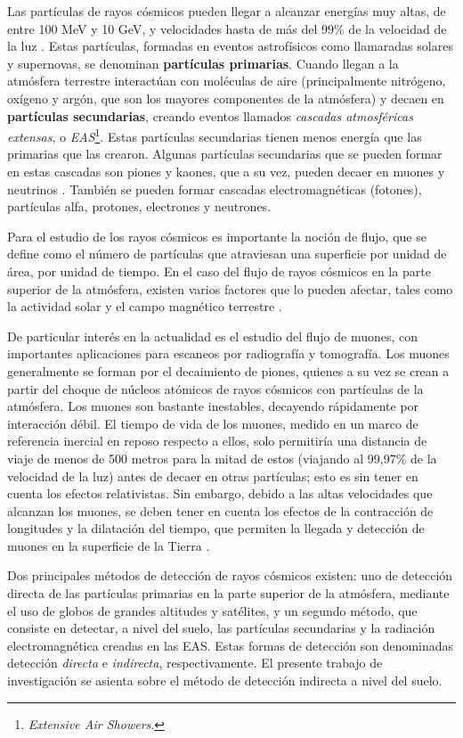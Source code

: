\documentclass[12pt]{report}
\begin{document}
Las partículas de rayos cósmicos pueden llegar a alcanzar energías muy altas, de entre 100 MeV y 10 GeV, y velocidades hasta de más del 99\% de la velocidad de la luz \cite{moldwin2008introduction}. Estas partículas, formadas en eventos astrofísicos como llamaradas solares y supernovas, se denominan \textbf{partículas primarias}. Cuando llegan a la atmósfera terrestre interactúan con moléculas de aire (principalmente nitrógeno, oxígeno y argón, que son los mayores componentes de la atmósfera) y decaen en \textbf{partículas secundarias}, creando eventos llamados \textit{cascadas atmosféricas extensas}, o \textit{EAS}\footnote{\textit{Extensive Air Showers}.}. Estas partículas secundarias tienen menos energía que las primarias que las crearon. Algunas partículas secundarias que se pueden formar en estas cascadas son piones y kaones, que a su vez, pueden decaer en muones y neutrinos \cite{grieder2010extensive}. También se pueden formar cascadas electromagnéticas (fotones), partículas alfa, protones, electrones y neutrones.

Para el estudio de los rayos cósmicos es importante la noción de flujo, que se define como el número de partículas que atraviesan una superficie por unidad de área, por unidad de tiempo. En el caso del flujo de rayos cósmicos en la parte superior de la atmósfera, existen varios factores que lo pueden afectar, tales como la actividad solar y el campo magnético terrestre \cite{PhysRevD.98.030001}.

De particular interés en la actualidad es el estudio del flujo de muones, con importantes aplicaciones para escaneos por radiografía y tomografía. Los muones generalmente se forman por el decaimiento de piones, quienes a su vez se crean a partir del choque de núcleos atómicos de rayos cósmicos con partículas de la atmósfera. Los muones son bastante inestables, decayendo rápidamente por interacción débil. El tiempo de vida de los muones, medido en un marco de referencia inercial en reposo respecto a ellos, solo permitiría una distancia de viaje de menos de 500 metros para la mitad de estos (viajando al 99,97\% de la velocidad de la luz) antes de decaer en otras partículas; esto es sin tener en cuenta los efectos relativistas. Sin embargo, debido a las altas velocidades que alcanzan los muones, se deben tener en cuenta los efectos de la contracción de longitudes y la dilatación del tiempo, que permiten la llegada y detección de muones en la superficie de la Tierra \cite{cunningham2019high}.

Dos principales métodos de detección de rayos cósmicos existen: uno de detección directa de las partículas primarias en la parte superior de la atmósfera, mediante el uso de globos de grandes altitudes y satélites, y un segundo método, que consiste en detectar, a nivel del suelo, las partículas secundarias y la radiación electromagnética creadas en las EAS. Estas formas de detección son denominadas detección \textit{directa} e \textit{indirecta}, respectivamente. El presente trabajo de investigación se asienta sobre el método de detección indirecta a nivel del suelo.
\end{document}

